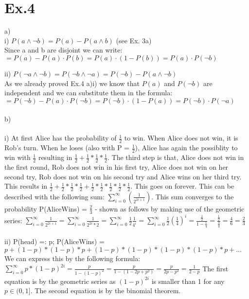\documentclass[11pt]{article}
\begin{document}
\section*{Ex.4}

a)\\
i) $P(a \wedge \neg b) = P(a) - P(a \wedge b) $ (see Ex. 3a) \\
Since a and b are disjoint we can write: \\
$ = P(a) - P(a) \cdot P(b) = P(a) \cdot (1 - P(b)) = P(a) \cdot P(\neg b)$ \newline 
\newline

ii) $P(\neg a \wedge \neg b) = P(\neg b \wedge \neg a) = P(\neg b) - P(a \wedge \neg b)$ \\
As we already proved Ex.4 a)i) we know that $P(a)$ and $P(\neg b)$ are independent and we can substitute them in the formula: \\
$= P(\neg b) - P(a) \cdot P(\neg b) = P(\neg b) \cdot (1 - P(a)) = P(\neg b) \cdot P(\neg a)$
\\ \\
\noindent
b)\\
\\
i) At first Alice has the probability of $\frac{1}{2}$ to win. When Alice does not win, it is Rob's turn. When he loses (also with P = $\frac{1}{2}$), Alice has again the possiblity to win with $\frac{1}{2}$ resulting in $\frac{1}{2}+\frac{1}{2}*\frac{1}{2}*\frac{1}{2}$. The third step is that, Alice does not win in the first round, Rob does not win in his first try, Alice does not win on her second try, Rob does not win on his second try and Alice wins on her third try. This results in $\frac{1}{2}+\frac{1}{2}*\frac{1}{2}*\frac{1}{2}+\frac{1}{2}*\frac{1}{2}*\frac{1}{2}*\frac{1}{2}*\frac{1}{2}$. This goes on forever. This can be described with the following sum: $ \sum\nolimits_{i=0}^\infty(\frac{1}{2^{2i+1}})$. This sum converges to the probability P(AliceWins) = $\frac{2}{3}$ - shown as follows by making use of the geometric series: $ \sum\nolimits_{i=0}^\infty\frac{1}{2^{2i+1}} = \sum\nolimits_{i=0}^\infty\frac{1}{2^{2i}*2} = \sum\nolimits_{i=0}^\infty\frac{1}{2}\frac{1}{4^{i}} = \sum\nolimits_{i=0}^\infty\frac{1}{2}(\frac{1}{4})^{i} = \frac{\frac{1}{2}}{1-\frac{1}{4}} = \frac{\frac{1}{2}}{\frac{3}{4}} = \frac{4}{6} = \frac{2}{3}$\\
\\
ii) P(head) =: p; P(AliceWins) = $p + (1-p) *(1-p) * p + (1-p) * (1-p) * (1-p) * (1-p) *p + \dots$ We can express this by the following formula: $\sum\nolimits_{i=0}^\infty p*(1-p)^{2i} = \frac{p}{1-(1-p)^{2}} = \frac{p}{1-(1-2p+p^{2})} = \frac{p}{2p-p^{2}} = \frac{1}{2-p}$ The first equation is by the geometric series as $(1-p)^{2i}$ is smaller than 1 for any $p \in (0,1]$. The second equation is by the binomial theorem.\\
\end{document}
